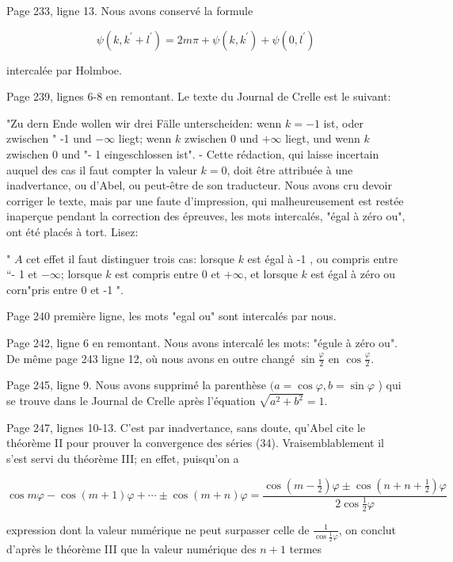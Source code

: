 \documentclass{article}
\begin{document}
Page 233, ligne 13. Nous avons conservé la formule

\[
\psi\left(k, k^{\prime}+l^{\prime}\right)=2 m \pi+\psi\left(k, k^{\prime}\right)+\psi\left(0, l^{\prime}\right)
\]

intercalée par Holmboe.

Page 239, lignes 6-8 en remontant. Le texte du Journal de Crelle est le suivant:

"Zu dern Ende wollen wir drei Fälle unterscheiden: wenn \(k=-1\) ist, oder zwischen " -1 und \(-\infty\) liegt; wenn \(k\) zwischen 0 und \(+\infty\) liegt, und wenn \(k\) zwischen 0 und "- 1 eingeschlossen ist".
- Cette rédaction, qui laisse incertain auquel des cas il faut compter la valeur \(k=0\), doit être attribuée à une inadvertance, ou d'Abel, ou peut-être de son traducteur. Nous avons cru devoir corriger le texte, mais par une faute d'impression, qui malheureusement est restée inaperçue pendant la correction des épreuves, les mots intercalés, "égal à zéro ou", ont été placés à tort. Lisez:

" \(A\) cet effet il faut distinguer trois cas: lorsque \(k\) est égal à -1 , ou compris entre “- 1 et \(-\infty\); lorsque \(k\) est compris entre 0 et \(+\infty\), et lorsque \(k\) est égal à zéro ou corn"pris entre 0 et -1 ".

Page 240 première ligne, les mots "egal ou" sont intercalés par nous.

Page 242, ligne 6 en remontant. Nous avons intercalé les mots: "égule à zéro ou". De même page 243 ligne 12, où nous avons en outre changé \(\sin \frac{\varphi}{2}\) en \(\cos \frac{\varphi}{2}\).

Page 245, ligne 9. Nous avons supprimé la parenthèse \((a=\cos \varphi, b=\sin \varphi\) ) qui se trouve dans le Journal de Crelle après l'équation \(\sqrt{a^{2}+b^{2}}=1\).

Page 247, lignes 10-13. C'est par inadvertance, sans doute, qu'Abel cite le théorème II pour prouver la convergence des séries (34). Vraisemblablement il s'est servi du théorème III; en effet, puisqu'on a

\[
\cos m \varphi-\cos (m+1) \varphi+\cdots \pm \cos (m+n) \varphi=\frac{\cos \left(m-\frac{1}{2}\right) \varphi \pm \cos \left(n+n+\frac{1}{2}\right) \varphi}{2 \cos \frac{1}{2} \varphi}
\]

expression dont la valeur numérique ne peut surpasser celle de \(\frac{1}{\cos \frac{1}{2} \varphi}\), on conclut d'après le théorème III que la valeur numérique des \(n+1\) termes
\end{document}
